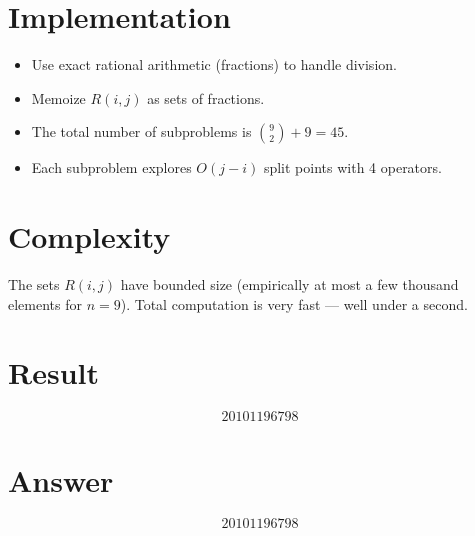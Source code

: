 \documentclass[12pt]{article}
\begin{document}
\section{Implementation}

\begin{itemize}
    \item Use exact rational arithmetic (fractions) to handle division.
    \item Memoize $R(i,j)$ as sets of fractions.
    \item The total number of subproblems is $\binom{9}{2} + 9 = 45$.
    \item Each subproblem explores $O(j-i)$ split points with 4 operators.
\end{itemize}

\section{Complexity}

The sets $R(i,j)$ have bounded size (empirically at most a few thousand elements for $n = 9$). Total computation is very fast --- well under a second.

\section{Result}

\[
\boxed{20101196798}
\]

\section{Answer}

\[
\boxed{20101196798}
\]
\end{document}

